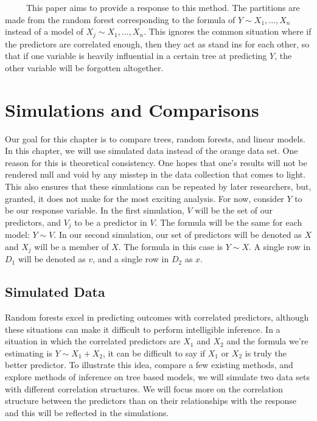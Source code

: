 \documentclass[12pt,twoside]{reedthesis}
\begin{document}
  ~~~~~This paper aims to provide a response to this method. The
  partitions are made from the random forest corresponding to the formula
  of \(Y \sim X_1,...,X_n\) instead of a model of
  \(X_j \sim X_1,...,X_n\). This ignores the common situation where if the
  predictors are correlated enough, then they act as stand ins for each
  other, so that if one variable is heavily influential in a certain tree
  at predicting \(Y\), the other variable will be forgotten altogether.
  
  \chapter{Simulations and Comparisons}\label{simulations-and-comparisons}
  
  Our goal for this chapter is to compare trees, random forests, and
  linear models. In this chapter, we will use simulated data instead of
  the orange data set. One reason for this is theoretical consistency. One
  hopes that one's results will not be rendered null and void by any
  misstep in the data collection that comes to light. This also ensures
  that these simulations can be repeated by later researchers, but,
  granted, it does not make for the most exciting analysis. For now,
  consider \(Y\) to be our response variable. In the first simulation,
  \(V\) will be the set of our predictors, and \(V_j\) to be a predictor
  in \(V\). The formula will be the same for each model: \(Y \sim V\). In
  our second simulation, our set of predictors will be denoted as \(X\)
  and \(X_j\) will be a member of \(X\). The formula in this case is
  \(Y \sim X\). A single row in \(D_1\) will be denoted as \(v\), and a
  single row in \(D_2\) as \(x\).
  
  \section{Simulated Data}\label{simulated-data}
  
  Random forests excel in predicting outcomes with correlated predictors,
  although these situations can make it difficult to perform intelligible
  inference. In a situation in which the correlated predictors are \(X_1\)
  and \(X_2\) and the formula we're estimating is \(Y \sim X_1 + X_2\), it
  can be difficult to say if \(X_1\) or \(X_2\) is truly the better
  predictor. To illustrate this idea, compare a few existing methods, and
  explore methods of inference on tree based models, we will simulate two
  data sets with different correlation structures. We will focus more on
  the correlation structure between the predictors than on their
  relationships with the response and this will be reflected in the
  simulations.
  
\end{document}
